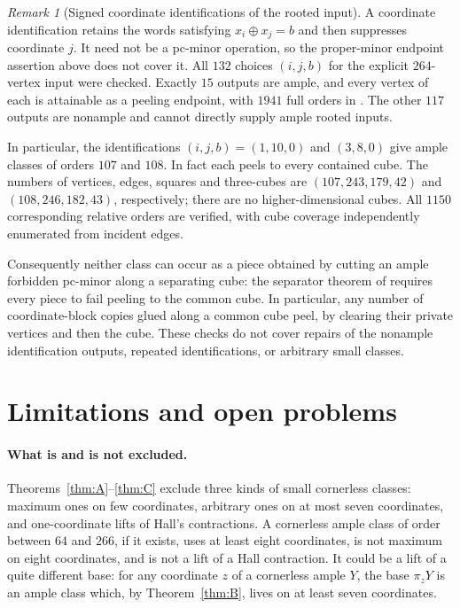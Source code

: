 \documentclass[11pt]{article}
\numberwithin{equation}{section}
\theoremstyle{definition}
\theoremstyle{remark}
\newtheorem{remark}[theorem]{Remark}
\begin{document}
\begin{remark}[Signed coordinate identifications of the rooted input]
\label{rem:root264-identifications}
A coordinate identification retains the words satisfying
$x_i\mathbin{\oplus}x_j=b$ and then suppresses coordinate $j$.
It need not be a pc-minor operation, so the proper-minor endpoint assertion
above does not cover it. All $132$ choices $(i,j,b)$ for the explicit
$264$-vertex input were checked. Exactly $15$ outputs are ample, and every
vertex of each is attainable as a peeling endpoint, with $1941$ full orders
in . The other $117$ outputs are
nonample and cannot directly supply ample rooted inputs.

In particular, the identifications $(i,j,b)=(1,10,0)$ and $(3,8,0)$ give
ample classes of orders $107$ and $108$. In fact each peels to every
contained cube. The numbers of vertices, edges, squares and three-cubes are
$(107,243,179,42)$ and $(108,246,182,43)$, respectively; there are no
higher-dimensional cubes. All $1150$ corresponding relative orders are
verified, with cube coverage independently enumerated from incident edges.

Consequently neither class can occur as a piece obtained by cutting an
ample forbidden pc-minor along a separating cube: the separator theorem of
\cite{BousquetDampReader} requires every piece to fail peeling to the common
cube. In particular, any number of coordinate-block copies glued along a
common cube peel, by clearing their private vertices and then the cube.
These checks do not cover repairs of the nonample identification outputs,
repeated identifications, or arbitrary small classes.
\end{remark}

\section{Limitations and open problems}
\label{sec:open}

\paragraph{What is and is not excluded.}
Theorems~\ref{thm:A}--\ref{thm:C} exclude three kinds of small cornerless
classes: maximum ones on few coordinates, arbitrary ones on at most seven
coordinates, and one-coordinate lifts of Hall's contractions.  A cornerless
ample class of order between \(64\) and \(266\), if it exists, uses at least
eight coordinates, is not maximum on eight coordinates, and is not a lift
of a Hall contraction.  It could be a lift of a quite different base: for
any coordinate \(z\) of a cornerless ample \(Y\), the base \(\pi_zY\) is an
ample class which, by Theorem~\ref{thm:B}, lives on at least seven
coordinates.
\end{document}
